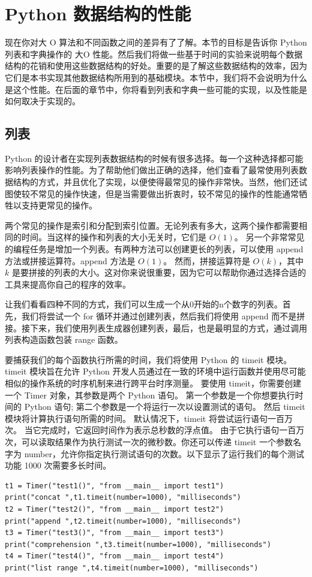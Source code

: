 \section{Python 数据结构的性能}
        
现在你对大 O 算法和不同函数之间的差异有了了解。本节的目标是告诉你 Python 列表和字典操作的 大O 性能。然后我们将做一些基于时间的实验来说明每个数据结构的花销和使用这些数据结构的好处。重要的是了解这些数据结构的效率，因为它们是本书实现其他数据结构所用到的基础模块。本节中，我们将不会说明为什么是这个性能。在后面的章节中，你将看到列表和字典一些可能的实现，以及性能是如何取决于实现的。


\subsection{列表}
        
Python 的设计者在实现列表数据结构的时候有很多选择。每一个这种选择都可能影响列表操作的性能。为了帮助他们做出正确的选择，他们查看了最常使用列表数据结构的方式，并且优化了实现，以便使得最常见的操作非常快。当然，他们还试图使较不常见的操作快速，但是当需要做出折衷时，较不常见的操作的性能通常牺牲以支持更常见的操作。

两个常见的操作是索引和分配到索引位置。无论列表有多大，这两个操作都需要相同的时间。当这样的操作和列表的大小无关时，它们是 $O(1)$。
另一个非常常见的编程任务是增加一个列表。有两种方法可以创建更长的列表，可以使用 append 方法或拼接运算符。append 方法是 $O(1)$。 然而，拼接运算符是 $O(k)$，其中 $k$ 是要拼接的列表的大小。这对你来说很重要，因为它可以帮助你通过选择合适的工具来提高你自己的程序的效率。

让我们看看四种不同的方式，我们可以生成一个从0开始的n个数字的列表。首先，我们将尝试一个 for 循环并通过创建列表，然后我们将使用 append 而不是拼接。接下来，我们使用列表生成器创建列表，最后，也是最明显的方式，通过调用列表构造函数包装 range 函数。 




要捕获我们的每个函数执行所需的时间，我们将使用 Python 的 timeit 模块。
timeit 模块旨在允许 Python 开发人员通过在一致的环境中运行函数并使用尽可能相似的操作系统的时序机制来进行跨平台时序测量。
要使用 timeit，你需要创建一个 Timer 对象，其参数是两个 Python 语句。
第一个参数是一个你想要执行时间的 Python 语句; 
第二个参数是一个将运行一次以设置测试的语句。
然后 timeit 模块将计算执行语句所需的时间。
默认情况下，timeit 将尝试运行语句一百万次。 
当它完成时，它返回时间作为表示总秒数的浮点值。
由于它执行语句一百万次，可以读取结果作为执行测试一次的微秒数。你还可以传递 timeit 一个参数名字为 number，允许你指定执行测试语句的次数。以下显示了运行我们的每个测试功能 1000 次需要多长时间。
\begin{lstlisting}
t1 = Timer("test1()", "from __main__ import test1")
print("concat ",t1.timeit(number=1000), "milliseconds")
t2 = Timer("test2()", "from __main__ import test2")
print("append ",t2.timeit(number=1000), "milliseconds")
t3 = Timer("test3()", "from __main__ import test3")
print("comprehension ",t3.timeit(number=1000), "milliseconds")
t4 = Timer("test4()", "from __main__ import test4")
print("list range ",t4.timeit(number=1000), "milliseconds")
\end{lstlisting}


